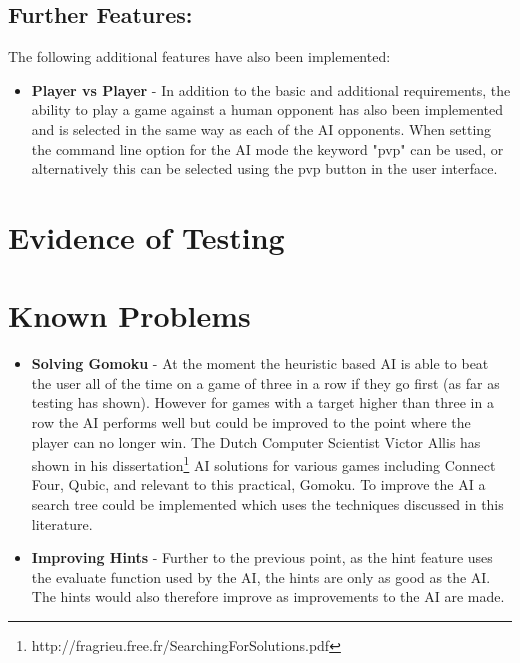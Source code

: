 \documentclass[11]{article}
\begin{document}
	\subsection{Further Features:}
		The following additional features have also been implemented:
		\begin{itemize}
			\item \textbf{Player vs Player } - In addition to the basic and additional requirements, the ability to play a game against a human opponent has also been implemented and is selected in the same way as each of the AI opponents. When setting the command line option for the AI mode the keyword "pvp" can be used, or alternatively this can be selected using the pvp button in the user interface.
		\end{itemize}
		
	\section{Evidence of Testing}	
		
		
	\section{Known Problems}
		\begin{itemize}
			\item \textbf{Solving Gomoku} - At the moment the heuristic based AI is able to beat the user all of the time on a game of three in a row if they go first (as far as testing has shown). However for games with a target higher than three in a row the AI performs well but could be improved to the point where the player can no longer win. The Dutch Computer Scientist Victor Allis has shown in his dissertation\footnote{http://fragrieu.free.fr/SearchingForSolutions.pdf} AI solutions for various games including Connect Four, Qubic, and relevant to this practical, Gomoku. To improve the AI a search tree could be implemented which uses the techniques discussed in this literature.
			\item \textbf{Improving Hints} - Further to the previous point, as the hint feature uses the evaluate function used by the AI, the hints are only as good as the AI. The hints would also therefore improve as improvements to the AI are made.
		\end{itemize}
		
\end{document}
